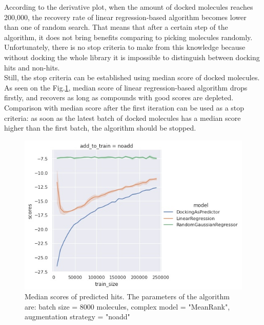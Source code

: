 According to the derivative plot, when the amount of docked molecules reaches 200,000, the recovery rate of linear regression-based algorithm becomes lower than one of random search.
That means that after a certain step of the algorithm, it does not bring benefits comparing to picking molecules randomly.
Unfortunately, there is no stop criteria to make from this knowledge because without docking the whole library it is impossible to distinguish between docking hits and non-hits.\\

Still, the stop criteria can be established using median score of docked molecules. 
As seen on the Fig.\ref{scores}, median score of linear regression-based algorithm drops firstly, and recovers as long as compounds with good scores are depleted. 
Comparison with median score after the first iteration can be used as a stop criteria: as soon as the latest batch of docked molecules has a median score higher than the first batch, the algorithm should be stopped.
\begin{figure}[H]
\centering
\includegraphics[width = 0.85\linewidth]{Images/4eiyScoresBest.jpg}
\caption{Median scores of predicted hits. The parameters of the algorithm are: batch size = 8000 molecules, complex model = "MeanRank", augmentation strategy = "noadd"}
\label{scores}
\end{figure}

